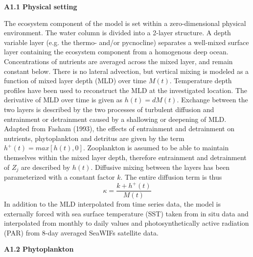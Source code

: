 \documentclass[11pt,letterpaper,english]{article}
\begin{document}
{\bf {\large A1.1 Physical setting}}

The ecosystem component of the model is set within a zero-dimensional physical environment. The water column is divided into a 2-layer structure. A depth variable layer (e.g. the thermo- and/or pycnocline) separates a well-mixed surface layer containing the ecosystem component from a homogenous deep ocean. Concentrations of nutrients are averaged across the mixed layer, and remain constant below.  There is no lateral advection, but vertical mixing is modeled as a function of mixed layer depth (MLD) over time $M(t)$. Temperature depth profiles have been used to reconstruct the MLD at the investigated location. The derivative of MLD over time is given as $h(t) = dM(t)$. Exchange between the two layers is described by the two processes of turbulent diffusion and entrainment or detrainment caused by a shallowing or deepening of MLD. Adapted from Fasham (1993), the effects of entrainment and detrainment on nutrients, phytoplankton and detritus are given by the term $h^{+}(t)= max[h(t),0]$. Zooplankton is assumed to be able to maintain themselves within the mixed layer depth, therefore entrainment and detrainment of $Z_j$ are described by $h(t)$. Diffusive mixing between the layers has been parameterized with a constant factor $k$. The entire diffusion term is thus
\begin{equation}
\kappa = \frac{k + h^{+}(t)}{M(t)}
\end{equation}
In addition to the MLD interpolated from time series data, the model is externally forced with sea surface temperature (SST) taken from in situ data and interpolated from monthly to daily values and photosynthetically active radiation (PAR) from 8-day averaged SeaWIFs satellite data.

{\bf {\large A1.2 Phytoplankton}}
\end{document}
